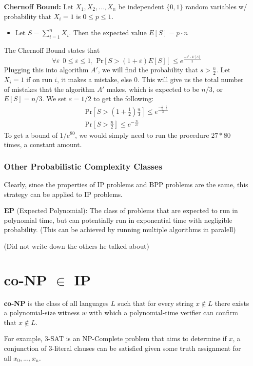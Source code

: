 \documentclass[11pt]{article}
\begin{document}
\textbf{Chernoff Bound:} Let $X_1,X_2,...,X_n$ be independent $\{0,1\}$ random variables w/ probability that $X_i = 1$ is $0 \leq p \leq 1$.
\begin{itemize}
    \item Let $S = \sum\limits_{i=1}^{n}X_i$. Then the expected value $E[S] = p \cdot n$
\end{itemize}
The Chernoff Bound states that
$$\forall \varepsilon\ \ 0 \leq \varepsilon \leq 1, \text{ Pr}[S > (1+\varepsilon)E[S]] \leq  e^{\frac{-\varepsilon^2 \cdot E[S]}{3}}$$
Plugging this into algorithm $A'$, we will find the probability that $s > \frac{n}{2}$. Let $X_i = 1$ if on run $i$, it makes a mistake, else $0$. This will give us the total number of mistakes that the algorithm $A'$ makes, which is expected to be $n/3$, or $E[S] = n/3$. We set $\varepsilon = 1/2$ to get the following:
\begin{align*}
\text{Pr}[S > (1 + \frac{1}{2})\frac{n}{3}] \leq e^{\frac{-\frac{1}{4}\cdot \frac{n}{3}}{3}}\\
\text{Pr}[S > \frac{n}{2}] \leq e^{-\frac{n}{27}}
\end{align*}
To get a bound of $1/e^{80}$, we would simply need to run the procedure $27 * 80$ times, a constant amount.

\subsubsection{Other Probabilistic Complexity Classes}
Clearly, since the properties of IP problems and BPP problems are the same, this strategy can be applied to IP problems.
\vspace{1em}

\textbf{EP} (Expected Polynomial): The class of problems that are expected to run in polynomial time, but can potentially run in exponential time with negligible probability. (This can be achieved by running multiple algorithms in paralell)

(Did not write down the others he talked about)

\section{co-NP $\in$ IP}
\textbf{co-NP} is the class of all languages $L$ such that for every string $x \notin L$ there exists a polynomial-size witness $w$ with which a polynomial-time verifier can confirm that $x \notin L$.
\vspace{1em}

For example, $3$-SAT is an NP-Complete problem that aims to determine if $x$, a conjunction of 3-literal clauses can be satisfied given some truth assignment for all $x_0,...,x_n$.
\vspace{1em}
\end{document}
